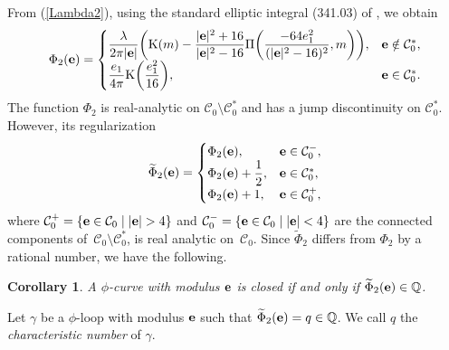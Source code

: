 \documentclass[10pt,a4paper]{amsart}
\def\Phit{\widetilde\Phi}
\def\gam{\gamma} %
\newcommand\be{{\bf e}}
\numberwithin{equation}{section}
\newtheorem{Corollary}[Theorem]{Corollary}
\begin{document}
From (\ref{Lambda2}), using the standard elliptic integral (341.03) of \cite{BF}, we obtain
\[
\Phi_2(\be)=\begin{cases}\displaystyle \frac{\lambda}{2\pi |\be|}\biggl({\rm K}(m)-
\frac{|\be |^2+16}{|\be |^2-16}\Pi \biggl(\frac{-64e_1^2}{(|\be |^2-16)^2},m\biggr)\biggr), &\be\notin {\mathcal C}_0^*,\\
\displaystyle \frac{e_1}{4\pi}{\rm K}\biggl(\frac{e_1^2}{16}\biggr), & \be\in {\mathcal C}_0^*.
\end{cases}
\]
The function $\Phi_2$ is real-analytic on ${\mathcal C}_0\setminus {\mathcal C}^*_0$ and has a jump discontinuity on ${\mathcal C}^*_0$. However, its regularization
\[
\Phit_2(\be)=\begin{cases}\displaystyle \Phi_2(\be), & \be\in {\mathcal C}^-_0,\\
\displaystyle\Phi_2(\be)+\frac{1}{2}, & \be\in {\mathcal C}^*_0,\\
\displaystyle\Phi_2(\be)+1, & \be\in {\mathcal C}^+_0,
 \end{cases}
 \]
 where ${\mathcal C}^{+}_0=\{\be\in {\mathcal C}_0 \mid |\be|>4\}$ and ${\mathcal C}^{-}_0=\{\be\in {\mathcal C}_0 \mid |\be|<4\}$ are the connected components of~${\mathcal C}_0\setminus {\mathcal C}^*_0$, is real analytic on~${\mathcal C}_0$.
 Since $\Phit_2$ differs from $\Phi_2$ by a rational number, we have the following.

 \begin{Corollary} A $\phi$-curve with modulus $\be$ is closed if and only if
 $\Phit_2(\be)\in {\mathbb Q}$.\end{Corollary}

 \begin{Definition} Let $\gam$ be a $\phi$-loop with modulus $\be$ such that $\Phit_2(\be)=q\in {\mathbb Q}$. We call $q$
 the {\it characteristic number} of $\gam$. \end{Definition}
\end{document}
